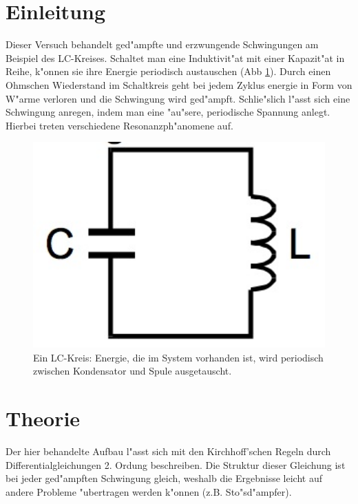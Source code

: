\section{Einleitung}
	\label{sec:einleitung}
	Dieser Versuch behandelt ged"ampfte und erzwungende Schwingungen am Beispiel des LC-Kreises.
	Schaltet man eine Induktivit"at mit einer Kapazit"at in Reihe, k"onnen sie ihre Energie periodisch austauschen (Abb \ref{fig:lc-kreis}).
	Durch einen Ohmschen Wiederstand im Schaltkreis geht bei jedem Zyklus energie in Form von W"arme verloren und die Schwingung wird ged"ampft.
	Schlie"slich l"asst sich eine Schwingung anregen, indem man eine "au"sere, periodische Spannung anlegt.
	Hierbei treten verschiedene Resonanzph"anomene auf.
	
	\begin{figure}[h!]
		\centering
		\includegraphics[width = 15cm]{img/lc-kreis.jpg}
		\caption{Ein LC-Kreis: Energie, die im System vorhanden ist, wird periodisch zwischen Kondensator und Spule ausgetauscht.}
		\label{fig:lc-kreis}
	\end{figure}

\section{Theorie}
	\label{sec:theorie}

	Der hier behandelte Aufbau l"asst sich mit den Kirchhoff'schen Regeln durch Differentialgleichungen 2. Ordung beschreiben.
	Die Struktur dieser Gleichung ist bei jeder ged"ampften Schwingung gleich, weshalb die Ergebnisse leicht auf andere Probleme "ubertragen werden k"onnen (z.B. Sto"sd"ampfer).

